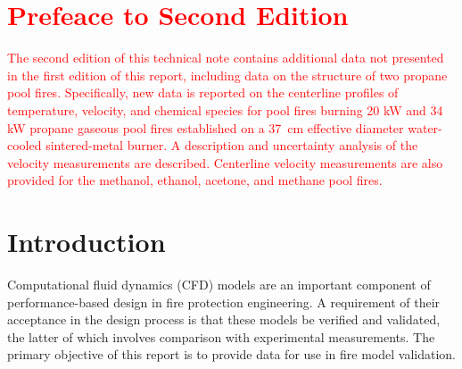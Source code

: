 \documentclass[12pt]{article}
\begin{document}
\begin{multicols}{2}
\printnomenclature
\end{multicols}
\clearpage
\section*{\textcolor{red}{Prefeace to Second Edition}}
\textcolor{red}{The second edition of this technical note contains additional data not presented in the first edition of this report, including data on the structure of two propane pool fires. Specifically, new data is reported on the centerline profiles of temperature, velocity, and chemical species for pool fires burning 20 kW and 34 kW propane gaseous pool fires established on a 37~cm effective diameter water-cooled sintered-metal burner. A description and uncertainty analysis of the velocity measurements are described. Centerline velocity measurements are also provided for the methanol, ethanol, acetone, and methane pool fires.}

\clearpage

\section{Introduction}
\label{sec:intro}
Computational fluid dynamics (CFD) models are an important component of performance-based design in fire protection engineering. A requirement of their acceptance in the design process is that these models be verified and validated, the latter of which involves comparison with experimental measurements. The primary objective of this report is to provide data for use in fire model validation.
\end{document}
